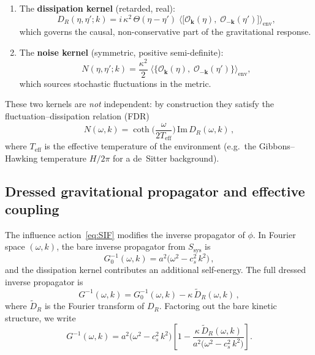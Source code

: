 \documentclass[12pt,a4paper]{article}
\begin{document}
\begin{enumerate}
\item The \textbf{dissipation kernel}
  (retarded, real):
  \begin{equation}\label{eq:DR-def}
    D_{R}(\eta,\eta';k)
    = i\,\kappa^{2}\,\Theta(\eta-\eta')\;
      \bigl\langle\bigl[\mathcal{O}_{\mathbf{k}}(\eta),\;
      \mathcal{O}_{-\mathbf{k}}(\eta')\bigr]\bigr\rangle_{\mathrm{env}},
  \end{equation}
  which governs the causal, non-conservative part of the gravitational
  response.

\item The \textbf{noise kernel}
  (symmetric, positive semi-definite):
  \begin{equation}\label{eq:N-def}
    N(\eta,\eta';k)
    = \frac{\kappa^{2}}{2}\;
      \bigl\langle\bigl\{\mathcal{O}_{\mathbf{k}}(\eta),\;
      \mathcal{O}_{-\mathbf{k}}(\eta')\bigr\}\bigr\rangle_{\mathrm{env}},
  \end{equation}
  which sources stochastic fluctuations in the metric.
\end{enumerate}

\noindent
These two kernels are \emph{not} independent: by construction they
satisfy the fluctuation--dissipation relation (FDR)
\begin{equation}\label{eq:FDR-basic}
  N(\omega,k)
  = \coth\!\biggl(\frac{\omega}{2T_{\mathrm{eff}}}\biggr)\,
    \mathrm{Im}\,D_{R}(\omega,k)\,,
\end{equation}
where $T_{\mathrm{eff}}$ is the effective temperature of the
environment (e.g.\ the Gibbons--Hawking temperature $H/2\pi$ for a
de~Sitter background).

\subsection{Dressed gravitational propagator and effective coupling}%
\label{ssec:resummation}

The influence action~\eqref{eq:SIF} modifies the inverse propagator of
$\phi$.  In Fourier space $(\omega,k)$, the bare inverse propagator
from $S_{\mathrm{sys}}$ is
\begin{equation}\label{eq:G0inv}
  G_{0}^{-1}(\omega,k)
  = a^{2}\bigl(\omega^{2}-c_{s}^{2}\,k^{2}\bigr)\,,
\end{equation}
and the dissipation kernel contributes an additional self-energy.
The full dressed inverse propagator is
\begin{equation}\label{eq:Ginv-dressed}
  G^{-1}(\omega,k)
  = G_{0}^{-1}(\omega,k) - \kappa\,\widetilde{D}_{R}(\omega,k)\,,
\end{equation}
where $\widetilde{D}_{R}$ is the Fourier transform of $D_{R}$.
Factoring out the bare kinetic structure, we write
\begin{equation}\label{eq:Geff}
  G^{-1}(\omega,k)
  = a^{2}\bigl(\omega^{2}-c_{s}^{2}\,k^{2}\bigr)
    \left[
      1 - \frac{\kappa\,\widetilde{D}_{R}(\omega,k)}
               {a^{2}\bigl(\omega^{2}-c_{s}^{2}\,k^{2}\bigr)}
    \right].
\end{equation}
\end{document}
